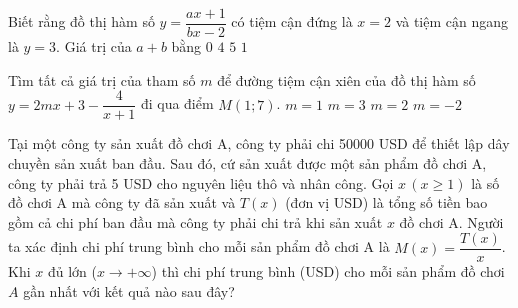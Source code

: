\begin{ex}
\begin{ex}
{}
\end{ex}
\begin{ex}
 Biết rằng đồ thị hàm số $ y=\dfrac{ax+1}{bx-2}$ có tiệm cận đứng là $x=2$ và tiệm cận ngang là $y=3$. Giá trị của $a+b$ bằng
 \choice
 {$0$}
 {\True $4$}
 {$5$}
 {$1$}
\end{ex}
\begin{ex}
 Tìm tất cả giá trị của tham số $m$ để đường tiệm cận xiên của đồ thị hàm số $y=2mx+3-\dfrac{4}{x+1}$ đi qua điểm $M(1;7)$.
 \choice
 {$m=1$}
 {$m=3$}
 {\True $m=2$}
 {$m=-2$}
\end{ex}
\begin{ex}
 Tại một công ty sản xuất đồ chơi A, công ty phải chi 50000 USD để thiết lập dây chuyền sản xuất ban đầu. Sau đó, cứ sản xuất được một sản phẩm đồ chơi A, công ty phải trả 5 USD cho nguyên liệu thô và nhân công. Gọi $x\,(x \geq 1)$ là số đồ chơi A mà công ty đã sản xuất và $T(x)$ (đơn vị USD) là tổng số tiền bao gồm cả chi phí ban đầu mà công ty phải chi trả khi sản xuất $x$ đồ chơi A. Người ta xác định chi phí trung bình cho mỗi sản phẩm đồ chơi A là $M(x)=\dfrac{T(x)}{x}$. Khi $x$ đủ lớn ($x\to +\infty$) thì chi phí trung bình (USD) cho mỗi sản phẩm đồ chơi $A$ gần nhất với kết quả nào sau đây?

\end{ex}
\end{ex}
